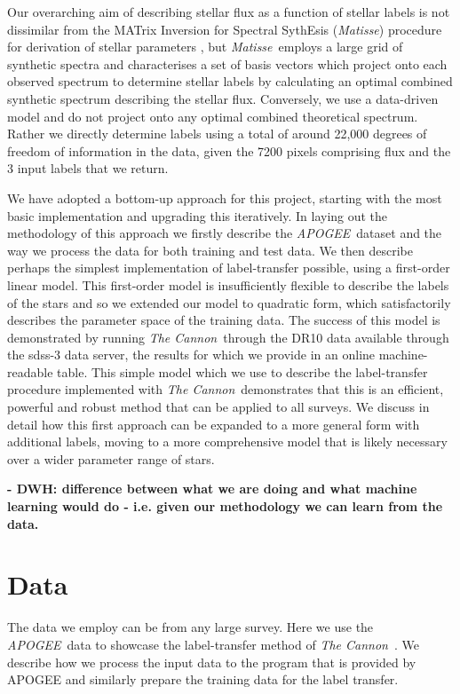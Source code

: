 \documentclass[12pt, preprint]{aastex}
\newcommand{\tc}{\textsl{The Cannon}}
\newcommand{\apogee}{\textsl{APOGEE}}
\newcommand{\matisse}{\textsl{Matisse}}
\begin{document}
Our overarching aim of describing stellar flux as a function of stellar labels is not dissimilar from the MATrix Inversion for Spectral SythEsis (\matisse) procedure for derivation of stellar parameters \citep{Reico-Blanco2006}, but \matisse\ employs a large grid of synthetic spectra and characterises a set of basis vectors which project onto each observed spectrum to determine stellar labels by calculating an optimal combined synthetic spectrum describing the stellar flux. Conversely, we use a data-driven model and do not project onto any optimal combined theoretical spectrum. Rather we directly determine labels using a total of around 22,000 degrees of freedom of information in the data, given the 7200 pixels comprising flux and the 3 input labels that we return. %

We have adopted a bottom-up approach for this project, starting with the most basic implementation and upgrading this iteratively.  In laying out the methodology of this approach we firstly describe the \apogee\ dataset and the way we process the data for both training and test data. We then describe perhaps the simplest implementation of label-transfer possible, using a first-order linear model. This first-order model is insufficiently flexible to describe the labels of the stars and so we extended our model to quadratic form, which satisfactorily describes the parameter space of the training data. The success of this model is demonstrated by running \tc\ through the DR10 data available through the sdss-3 data server, the results for which we provide in an online machine-readable table. This simple model which we use to describe the label-transfer procedure implemented with  \tc\, demonstrates that this is an efficient, powerful and robust method that can be applied to all surveys. We discuss in detail how this first approach can be expanded to a more general form with additional labels, moving to a more comprehensive model that is likely necessary over a wider parameter range of stars. 

\textbf{- DWH: difference between what we are doing and what machine learning would do - i.e. given our methodology we can learn from the data. }


\section{Data}

The data we employ can be from any large survey. Here we use the \apogee\ data to showcase the label-transfer method of \tc\ . We describe how we process the input data to the program that is provided by APOGEE and similarly prepare the training data for the label transfer. 
\end{document}
